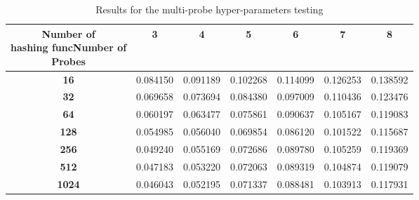 \begin{table}[h]
    \begin{center}
        \begin{tabular}{|c | c | c | c| c| c| c|}
            \hline
            \diagbox[width=10em]{Number of                                    \\hashing func}{Number of\\Probes}
                          & \textbf{3} & \textbf{4} & \textbf{5} &
            \textbf{6}    & \textbf{7} & \textbf{8}                           \\
            \hline

            \textbf{16}   & 0.084150   & 0.091189   & 0.102268   & 0.114099 &
            0.126253      & 0.138592                                          \\
            \hline
            \textbf{32}   & 0.069658   & 0.073694   & 0.084380   & 0.097009 &
            0.110436      & 0.123476                                          \\
            \hline
            \textbf{64}   & 0.060197   & 0.063477   & 0.075861   & 0.090637 &
            0.105167      & 0.119083                                          \\
            \hline
            \textbf{128}  & 0.054985   & 0.056040   & 0.069854   & 0.086120 &
            0.101522      & 0.115687                                          \\
            \hline
            \textbf{256}  & 0.049240   & 0.055169   & 0.072686   & 0.089780 &
            0.105259      & 0.119369                                          \\
            \hline
            \textbf{512}  & 0.047183   & 0.053220   & 0.072063   & 0.089319 &
            0.104874      & 0.119079                                          \\
            \hline
            \textbf{1024} & 0.046043   & 0.052195   & 0.071337   & 0.088481 &
            0.103913      & 0.117931                                          \\
            \hline
        \end{tabular}
    \end{center}
    \caption{Results for the multi-probe hyper-parameters testing}
    \label{table:multiprobe_hyperparameters}
\end{table}



